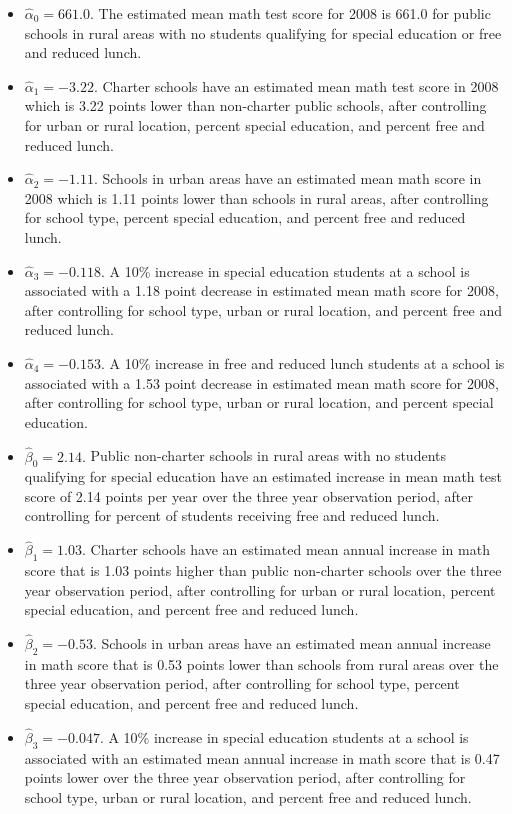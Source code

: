 \documentclass[
]{krantz}
\providecommand{\tightlist}{%
  \setlength{\itemsep}{0pt}\setlength{\parskip}{0pt}}
\begin{document}
\begin{itemize}
\tightlist
\item
  \(\hat{\alpha}_{0}= 661.0.\) The estimated mean math test score for 2008 is 661.0 for public schools in rural areas with no students qualifying for special education or free and reduced lunch.
\item
  \(\hat{\alpha}_{1}= -3.22.\) Charter schools have an estimated mean math test score in 2008 which is 3.22 points lower than non-charter public schools, after controlling for urban or rural location, percent special education, and percent free and reduced lunch.
\item
  \(\hat{\alpha}_{2}= -1.11.\) Schools in urban areas have an estimated mean math score in 2008 which is 1.11 points lower than schools in rural areas, after controlling for school type, percent special education, and percent free and reduced lunch.
\item
  \(\hat{\alpha}_{3}= -0.118.\) A 10\% increase in special education students at a school is associated with a 1.18 point decrease in estimated mean math score for 2008, after controlling for school type, urban or rural location, and percent free and reduced lunch.
\item
  \(\hat{\alpha}_{4}= -0.153.\) A 10\% increase in free and reduced lunch students at a school is associated with a 1.53 point decrease in estimated mean math score for 2008, after controlling for school type, urban or rural location, and percent special education.
\item
  \(\hat{\beta}_{0}= 2.14.\) Public non-charter schools in rural areas with no students qualifying for special education have an estimated increase in mean math test score of 2.14 points per year over the three year observation period, after controlling for percent of students receiving free and reduced lunch.
\item
  \(\hat{\beta}_{1}= 1.03.\) Charter schools have an estimated mean annual increase in math score that is 1.03 points higher than public non-charter schools over the three year observation period, after controlling for urban or rural location, percent special education, and percent free and reduced lunch.
\item
  \(\hat{\beta}_{2}= -0.53.\) Schools in urban areas have an estimated mean annual increase in math score that is 0.53 points lower than schools from rural areas over the three year observation period, after controlling for school type, percent special education, and percent free and reduced lunch.
\item
  \(\hat{\beta}_{3}= -0.047.\) A 10\% increase in special education students at a school is associated with an estimated mean annual increase in math score that is 0.47 points lower over the three year observation period, after controlling for school type, urban or rural location, and percent free and reduced lunch.
\end{itemize}
\end{document}
